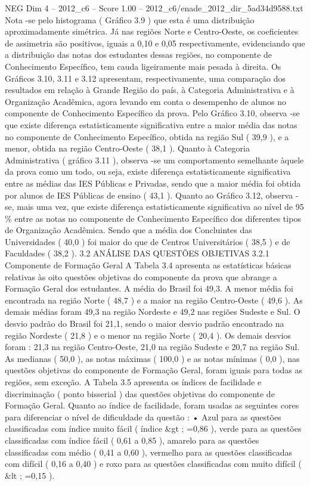 \begin{textsample}{NEG Dim 4 – 2012\_c6 – Score 1.00 – 2012\_c6/enade\_2012\_dir\_5ad34d9588.txt}
Nota -se pelo histograma ( Gráfico 3.9 ) que esta é uma distribuição aproximadamente simétrica.
Já nas regiões Norte e Centro-Oeste, os coeficientes de assimetria são positivos, iguais a 0,10 e 0,05 respectivamente, evidenciando que a distribuição das notas dos estudantes dessas regiões, no componente de Conhecimento Específico, tem cauda ligeiramente mais pesada à direita.
Os Gráficos 3.10, 3.11 e 3.12 apresentam, respectivamente, uma comparação dos resultados em relação à Grande Região do país, à Categoria Administrativa e à Organização Acadêmica, agora levando em conta o desempenho de alunos no componente de Conhecimento Específico da prova.
Pelo Gráfico 3.10, observa -se que existe diferença estatisticamente significativa entre a maior média das notas no componente de Conhecimento Específico, obtida na região Sul ( 39,9 ), e a menor, obtida na região Centro-Oeste ( 38,1 ).
Quanto à Categoria Administrativa ( gráfico 3.11 ), observa -se um comportamento semelhante àquele da prova como um todo, ou seja, existe diferença estatisticamente significativa entre as médias das IES Públicas e Privadas, sendo que a maior média foi obtida por alunos de IES Públicas de ensino ( 43,1 ).
Quanto ao Gráfico 3.12, observa -se, mais uma vez, que existe diferença estatisticamente significativa ao nível de 95 \% entre as notas no componente de Conhecimento Específico dos diferentes tipos de Organização Acadêmica.
Sendo que a média dos Concluintes das Universidades ( 40,0 ) foi maior do que de Centros Universitários ( 38,5 ) e de Faculdades ( 38,2 ). 3.2 ANÁLISE DAS QUESTÕES OBJETIVAS 3.2.1 Componente de Formação Geral A Tabela 3.4 apresenta as estatísticas básicas relativas às oito questões objetivas do componente da prova que abrange a Formação Geral dos estudantes.
A média do Brasil foi 49,3.
A menor média foi encontrada na região Norte ( 48,7 ) e a maior na região Centro-Oeste ( 49,6 ).
As demais médias foram 49,3 na região Nordeste e 49,2 nas regiões Sudeste e Sul.
O desvio padrão do Brasil foi 21,1, sendo o maior desvio padrão encontrado na região Nordeste ( 21,8 ) e o menor na região Norte ( 20,4 ).
Os demais desvios foram : 21,3 na região Centro-Oeste, 21,0 na região Sudeste e 20,7 na região Sul.
As medianas ( 50,0 ), as notas máximas ( 100,0 ) e as notas mínimas ( 0,0 ), nas questões objetivas do componente de Formação Geral, foram iguais para todas as regiões, sem exceção.
A Tabela 3.5 apresenta os índices de facilidade e discriminação ( ponto bisserial ) das questões objetivas do componente de Formação Geral.
Quanto ao índice de facilidade, foram usadas as seguintes cores para diferenciar o nível de dificuldade da questão : • Azul para as questões classificadas com índice muito fácil ( índice \&gt ; =0,86 ), verde para as questões classificadas com índice fácil ( 0,61 a 0,85 ), amarelo para as questões classificadas com médio ( 0,41 a 0,60 ), vermelho para as questões classificadas com difícil ( 0,16 a 0,40 ) e roxo para as questões classificadas com muito difícil ( \&lt ; =0,15 ).

\end{textsample}
